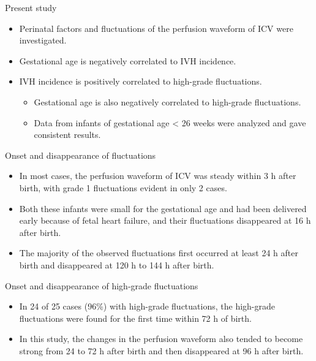 \documentclass{beamer}
\begin{document}
\begin{frame}{Present study}
    \begin{itemize}
        \item Perinatal factors and fluctuations of the perfusion waveform of ICV were investigated.
        \item Gestational age is negatively correlated to IVH incidence.
        \item IVH incidence is positively correlated to high-grade fluctuations.
            \begin{itemize}
                \item Gestational age is also negatively correlated to high-grade fluctuations.
                \item Data from infants of gestational age < 26 weeks were analyzed and gave consistent results.
            \end{itemize}
    \end{itemize}
\end{frame}

\begin{frame}{Onset and disappearance of fluctuations}
    \begin{itemize}
        \item In most cases, the perfusion waveform of ICV was steady within 3
            h after birth, with grade 1 fluctuations evident in only 2 cases.
        \item Both these infants were small for the gestational age and had
            been delivered early because of fetal heart failure, and their
            fluctuations disappeared at 16 h after birth.
        \item The majority of the observed fluctuations first occurred at least
            24 h after birth and disappeared at 120 h to 144 h after birth.
    \end{itemize}
\end{frame}

\begin{frame}{Onset and disappearance of high-grade fluctuations}
    \begin{itemize}
        \item In 24 of 25 cases (96\%) with high-grade fluctuations, the
            high-grade fluctuations were found for the first time within 72 h
            of birth.
        \item In this study, the changes in the perfusion waveform also tended
            to become strong from 24 to 72 h after birth and then disappeared
            at 96 h after birth.
    \end{itemize}
\end{frame}
\end{document}
